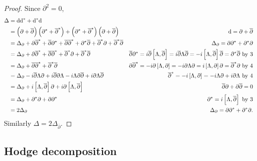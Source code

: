 \begin{proof}
Since $ \partial^2 = 0 $,
\begin{align*}
\Delta
& = \d\d^* + \d^*\d \\
& = \br{\partial + \overline{\partial}}\br{\partial^* + \overline{\partial}^*} + \br{\partial^* + \overline{\partial}^*}\br{\partial + \overline{\partial}} & \d = \partial + \overline{\partial} \\
& = \Delta_\partial + \partial\overline{\partial}^* + \overline{\partial}\partial^* + \overline{\partial}\overline{\partial}^* + \partial^*\overline{\partial} + \overline{\partial}^*\partial + \overline{\partial}^*\overline{\partial} & \Delta_\partial = \partial\partial^* + \partial^*\partial \\
& = \Delta_\partial + \partial\overline{\partial}^* + \overline{\partial}\overline{\partial}^* + \overline{\partial}^*\partial + \overline{\partial}^*\overline{\partial} & \overline{\partial}\partial^* = i\overline{\partial}\sbr{\Lambda, \overline{\partial}} = i\overline{\partial}\Lambda\overline{\partial} = -i\sbr{\Lambda, \overline{\partial}}\overline{\partial} = \partial^*\overline{\partial} \ \text{by} \ 3 \\
& = \Delta_\partial + \overline{\partial}\overline{\partial}^* + \overline{\partial}^*\overline{\partial} & \partial\overline{\partial}^* = -i\partial\sbr{\Lambda, \partial} = -i\partial\Lambda\partial = i\sbr{\Lambda, \partial}\partial = \overline{\partial}^*\partial \ \text{by} \ 4 \\
& = \Delta_\partial - i\overline{\partial}\Lambda\partial + i\overline{\partial}\partial\Lambda - i\Lambda\partial\overline{\partial} + i\partial\Lambda\overline{\partial} & \overline{\partial}^* = -i\sbr{\Lambda, \partial} = -i\Lambda\partial + i\partial\Lambda \ \text{by} \ 4 \\
& = \Delta_\partial + i\sbr{\Lambda, \overline{\partial}}\partial + i\partial\sbr{\Lambda, \overline{\partial}} & \overline{\partial}\partial + \partial\overline{\partial} = 0 \\
& = \Delta_\partial + \partial^*\partial + \partial\partial^* & \partial^* = i\sbr{\Lambda, \overline{\partial}} \ \text{by} \ 3 \\
& = 2\Delta_\partial & \Delta_\partial = \partial\partial^* + \partial^*\partial.
\end{align*}
Similarly $ \Delta = 2\Delta_{\overline{\partial}} $.
\end{proof}

\subsection{Hodge decomposition}

